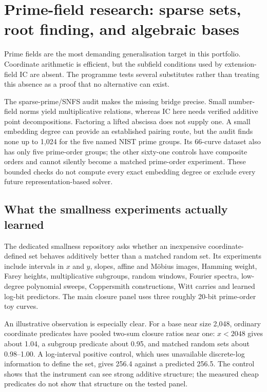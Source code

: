 \section{Prime-field research: sparse sets, root finding, and algebraic bases}\label{sec:prime}

Prime fields are the most demanding generalisation target in this
portfolio. Coordinate arithmetic is efficient, but the subfield
conditions used by extension-field IC are absent. The programme tests
several substitutes rather than treating this absence as a proof that no
alternative can exist.

The sparse-prime/SNFS audit makes the missing bridge precise. Small
number-field norms yield multiplicative relations, whereas IC here needs
verified additive point decompositions. Factoring a lifted abscissa does
not supply one. A small embedding degree can provide an established
pairing route, but the audit finds none up to 1,024 for the five named
NIST prime groups. Its 66-curve dataset also has only five prime-order
groups; the other sixty-one controls have composite orders and cannot
silently become a matched prime-order experiment. These bounded checks
do not compute every exact embedding degree or exclude every future
representation-based solver.

\subsection{What the smallness experiments actually learned}

The dedicated smallness repository asks whether an inexpensive
coordinate-defined set behaves additively better than a matched random
set. Its experiments include intervals in $x$ and $y$, slopes, affine and
M\"obius images, Hamming weight, Farey heights, multiplicative subgroups,
random windows, Fourier spectra, low-degree polynomial sweeps,
Coppersmith constructions, Witt carries and learned log-bit predictors.
The main closure panel uses three roughly 20-bit prime-order toy curves.

An illustrative observation is especially clear. For a base near size
2,048, ordinary coordinate predicates have pooled two-sum closure ratios
near one: $x<2048$ gives about 1.04, a subgroup predicate about 0.95, and
matched random sets about 0.98--1.00. A log-interval positive control,
which uses unavailable discrete-log information to define the set, gives
256.4 against a predicted 256.5. The control shows that the instrument
can see strong additive structure; the measured cheap predicates do not
show that structure on the tested panel.

